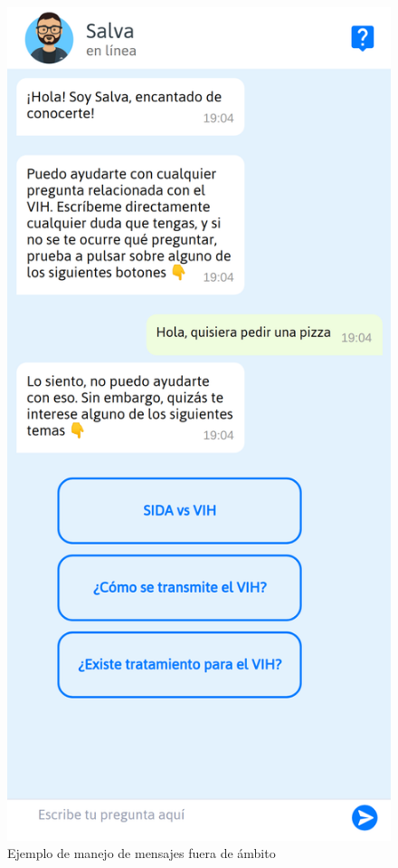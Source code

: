 \begin{figure}[htbp]
\centering
\includegraphics[scale=0.15]{../images/out_of_scope.png}
\caption{Ejemplo de manejo de mensajes fuera de ámbito}
\label{fig:out1}
\end{figure}

